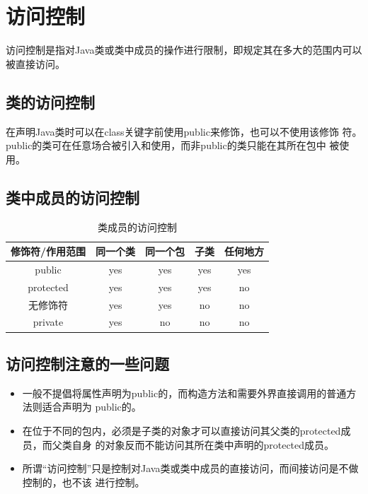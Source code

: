 \section{访问控制}

访问控制是指对Java类或类中成员的操作进行限制，即规定其在多大的范围内可以被直接访问。

\subsection{类的访问控制}

在声明Java类时可以在class关键字前使用public来修饰，也可以不使用该修饰
符。public的类可在任意场合被引入和使用，而非public的类只能在其所在包中
被使用。

\subsection{类中成员的访问控制}

\begin{table}[!htbp]
  \centering
  \caption{类成员的访问控制}
  \label{tab:java-class-member-access-control}
  \begin{tabular}{|c|c|c|c|c|}
    \hline
    {\bf 修饰符/作用范围} & {\bf 同一个类} & {\bf 同一个包} & {\bf 子类} & {\bf 任何地方} \\
    \hline
    public & yes & yes & yes & yes\\
    \hline
    protected  & yes & yes & yes & no \\
    \hline
    无修饰符 & yes & yes & no & no \\
    \hline
    private & yes & no & no & no \\
    \hline
  \end{tabular}
\end{table}

\subsection{访问控制注意的一些问题}

\begin{itemize}
\item 一般不提倡将属性声明为public的，而构造方法和需要外界直接调用的普通方法则适合声明为
  public的。
\item 在位于不同的包内，必须是子类的对象才可以直接访问其父类的protected成员，而父类自身
  的对象反而不能访问其所在类中声明的protected成员。
\item 所谓“访问控制”只是控制对Java类或类中成员的直接访问，而间接访问是不做控制的，也不该
  进行控制。
\end{itemize}

